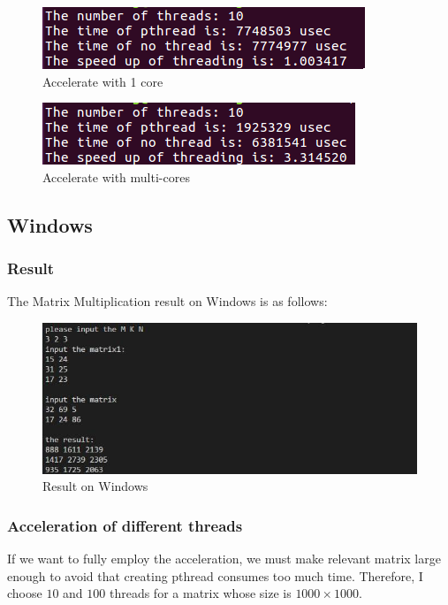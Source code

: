 \documentclass[12pt,a4paper]{article}
\begin{document}
\begin{minipage}{0.5\textwidth}
	\begin{figure}[H]
		\centering
		\includegraphics[scale= 0.8]{./fig/linux_result_core1.png}
		\caption{Accelerate with 1 core}
		\label{fig::linux with core1}
	\end{figure}
\end{minipage}
\begin{minipage}{0.5\textwidth}
	\begin{figure}[H]
		\centering
		\includegraphics[scale= 0.8]{./fig/linux_result_core2.png}
		\caption{Accelerate with multi-cores}
		\label{fig::linux with core2}
	\end{figure}
\end{minipage}
\subsection{Windows}
\subsubsection{Result}
The Matrix Multiplication result on Windows is as follows:
\begin{figure}[H]
	\centering
	\includegraphics[scale= 0.5]{./fig/win_result.jpg}
	\caption{Result on Windows}
	\label{fig::result on windows}
\end{figure}
\subsubsection{Acceleration of different threads}\label{Part: Use different threads }
If we want to fully employ the acceleration, we must make relevant matrix large enough to avoid that creating pthread consumes too much time. Therefore, I choose $10$ and $100$ threads for a matrix whose size is $1000 \times 1000$.
\end{document}
